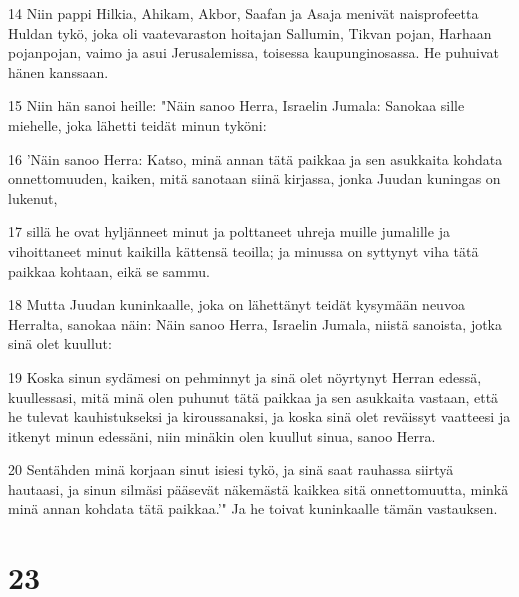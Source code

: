 \par 14 Niin pappi Hilkia, Ahikam, Akbor, Saafan ja Asaja menivät naisprofeetta Huldan tykö, joka oli vaatevaraston hoitajan Sallumin, Tikvan pojan, Harhaan pojanpojan, vaimo ja asui Jerusalemissa, toisessa kaupunginosassa. He puhuivat hänen kanssaan.
\par 15 Niin hän sanoi heille: "Näin sanoo Herra, Israelin Jumala: Sanokaa sille miehelle, joka lähetti teidät minun tyköni:
\par 16 'Näin sanoo Herra: Katso, minä annan tätä paikkaa ja sen asukkaita kohdata onnettomuuden, kaiken, mitä sanotaan siinä kirjassa, jonka Juudan kuningas on lukenut,
\par 17 sillä he ovat hyljänneet minut ja polttaneet uhreja muille jumalille ja vihoittaneet minut kaikilla kättensä teoilla; ja minussa on syttynyt viha tätä paikkaa kohtaan, eikä se sammu.
\par 18 Mutta Juudan kuninkaalle, joka on lähettänyt teidät kysymään neuvoa Herralta, sanokaa näin: Näin sanoo Herra, Israelin Jumala, niistä sanoista, jotka sinä olet kuullut:
\par 19 Koska sinun sydämesi on pehminnyt ja sinä olet nöyrtynyt Herran edessä, kuullessasi, mitä minä olen puhunut tätä paikkaa ja sen asukkaita vastaan, että he tulevat kauhistukseksi ja kiroussanaksi, ja koska sinä olet reväissyt vaatteesi ja itkenyt minun edessäni, niin minäkin olen kuullut sinua, sanoo Herra.
\par 20 Sentähden minä korjaan sinut isiesi tykö, ja sinä saat rauhassa siirtyä hautaasi, ja sinun silmäsi pääsevät näkemästä kaikkea sitä onnettomuutta, minkä minä annan kohdata tätä paikkaa.'" Ja he toivat kuninkaalle tämän vastauksen.

\chapter{23}

